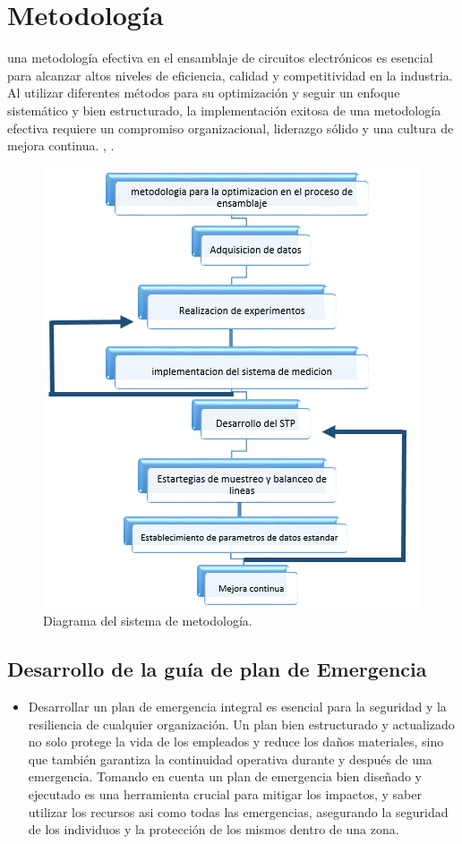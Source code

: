     \section{ Metodología }
    una metodología efectiva en el ensamblaje de circuitos electrónicos es esencial para alcanzar altos niveles de eficiencia, calidad y competitividad en la industria. Al utilizar diferentes métodos para su optimización y seguir un enfoque sistemático y bien estructurado, la implementación exitosa de una metodología efectiva requiere un compromiso organizacional, liderazgo sólido y una cultura de mejora continua.
    \cite{Groover}, \cite{Niebel}.
    \begin{figure}[H]
        \centering
    \includegraphics[scale=0.50]{1/img/Diagrama del sistema de metodologia.png}
        \caption{Diagrama del sistema de metodología.}
    \end{figure}
    
    
    \subsection{Desarrollo de la guía de plan de Emergencia}
    \begin{itemize}
    \item Desarrollar un plan de emergencia integral es esencial para la seguridad y la resiliencia de cualquier organización. Un plan bien estructurado y actualizado no solo protege la vida de los empleados y reduce los daños materiales, sino que también garantiza la continuidad operativa durante y después de una emergencia.
    Tomando en cuenta un plan de emergencia bien diseñado y ejecutado es una herramienta crucial para mitigar los impactos, y saber utilizar los recursos asi como todas las emergencias, asegurando la seguridad de los individuos y la protección de los mismos dentro de una zona.
    \end{itemize}
